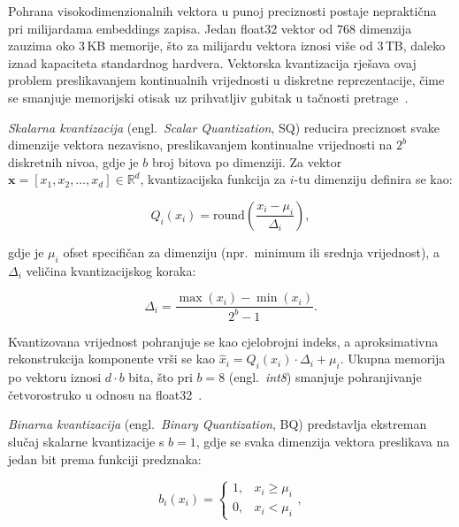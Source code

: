 Pohrana visokodimenzionalnih vektora u punoj preciznosti postaje
nepraktična pri milijardama embeddings zapisa. Jedan
\foreignlanguage{english}{float32} vektor od $768$ dimenzija zauzima
oko $3$\,KB memorije, što za milijardu vektora iznosi više od $3$\,TB,
daleko iznad kapaciteta standardnog hardvera.
Vektorska kvantizacija rješava ovaj problem preslikavanjem kontinualnih
vrijednosti u diskretne reprezentacije, čime se smanjuje memorijski otisak
uz prihvatljiv gubitak u tačnosti pretrage~\cite{raja2026memory}.

\emph{Skalarna kvantizacija}
(engl.\ \foreignlanguage{english}{\emph{Scalar Quantization}}, SQ)
reducira preciznost svake dimenzije vektora nezavisno, preslikavanjem
kontinualne vrijednosti na $2^b$ diskretnih nivoa, gdje je $b$ broj
bitova po dimenziji. Za vektor
$\mathbf{x} = [x_1, x_2, \dots, x_d] \in \mathbb{R}^d$,
kvantizacijska funkcija za $i$-tu dimenziju definira se kao:

\begin{equation}
    Q_i(x_i) = \mathrm{round}\!\left(\frac{x_i - \mu_i}{\Delta_i}\right),
    \label{eq:sq}
\end{equation}

\noindent gdje je $\mu_i$ ofset specifičan za dimenziju (npr.\ minimum ili
srednja vrijednost), a $\Delta_i$ veličina kvantizacijskog koraka:

\begin{equation}
    \Delta_i = \frac{\max(x_i) - \min(x_i)}{2^b - 1}.
    \label{eq:sq_step}
\end{equation}

\noindent Kvantizovana vrijednost pohranjuje se kao cjelobrojni indeks,
a aproksimativna rekonstrukcija komponente vrši se kao
$\hat{x}_i = Q_i(x_i) \cdot \Delta_i + \mu_i$.
Ukupna memorija po vektoru iznosi $d \cdot b$ bita, što pri $b = 8$
(engl.\ \foreignlanguage{english}{\emph{int8}}) smanjuje
pohranjivanje četvorostruko u odnosu na \foreignlanguage{english}{float32}~\cite{raja2026memory}.

\emph{Binarna kvantizacija}
(engl.\ \foreignlanguage{english}{\emph{Binary Quantization}}, BQ)
predstavlja ekstreman slučaj skalarne kvantizacije s $b = 1$,
gdje se svaka dimenzija vektora preslikava na jedan bit prema
funkciji predznaka:

\begin{equation}
    b_i(x_i) = \begin{cases} 1, & x_i \geq \mu_i \\ 0, & x_i < \mu_i \end{cases},
    \label{eq:bq}
\end{equation}


